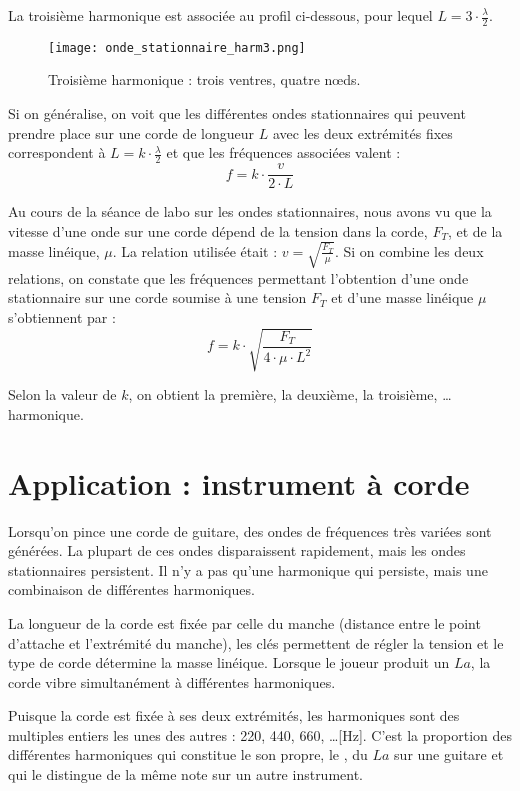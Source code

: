 La troisième harmonique est associée au profil ci-dessous, pour lequel  \(L=3 \cdot \frac{\lambda}{2}\).
\begin{figure}[ht!]
    \centering
    \texttt{[image: onde\_stationnaire\_harm3.png]}
    \caption{Troisième harmonique : trois ventres, quatre n\oe{}ds.}
\end{figure}

Si on généralise, on voit que les différentes ondes stationnaires qui peuvent prendre place sur une corde de longueur \(L\) avec les deux extrémités fixes correspondent à  \(L=k \cdot \frac{\lambda}{2}\) et que les fréquences associées valent :
\begin{equation}
    f=k \cdot \frac{v}{2 \cdot L}
\end{equation}

Au cours de la séance de labo sur les ondes stationnaires, nous avons vu que la vitesse d'une onde sur une corde dépend de la tension dans la corde, \(F_T\), et de la masse linéique, \(\mu\). La relation utilisée était : \(v=\sqrt{\frac{F_T}{\mu}}\). Si on combine les deux relations, on constate que les fréquences permettant l'obtention d'une onde stationnaire sur une corde soumise à une tension \(F_T\) et d'une masse linéique \(\mu\) s'obtiennent par :
\begin{equation}
    f=k \cdot \sqrt{\frac{F_T}{4\cdot \mu \cdot L^2}}
\end{equation}

Selon la valeur de \(k\), on obtient la première, la deuxième, la troisième, \ldots harmonique.

\newpage

\section{Application : instrument à corde}
Lorsqu'on pince une corde de guitare, des ondes de fréquences très variées sont générées. La plupart de ces ondes disparaissent rapidement, mais les ondes stationnaires persistent. Il n'y a pas qu'une harmonique qui persiste, mais une combinaison de différentes harmoniques.

La longueur de la corde est fixée par celle du manche (distance entre le point d'attache et l'extrémité du manche), les clés permettent de régler la tension et le type de corde détermine la masse linéique.
Lorsque le joueur produit un \(La\), la corde vibre simultanément à différentes harmoniques.

Puisque la corde est fixée à ses deux extrémités, les harmoniques sont des multiples entiers les unes des autres : 220, 440, 660, \ldots [Hz]. C'est la proportion des différentes harmoniques qui constitue le son propre, le , du \(La\) sur une  guitare et qui le distingue de la même note sur un autre instrument.

